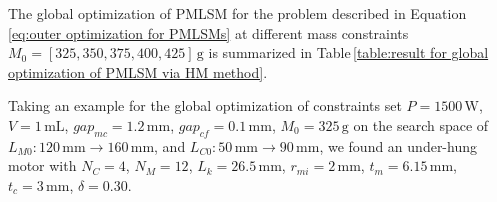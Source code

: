             
        The global optimization of \acs{PMLSM} for the problem described in Equation\,\ref{eq:outer optimization for PMLSMs} at different mass constraints $M_0=[325,350,375,400,425]\,\mathrm{g}$ is summarized in Table\,\ref{table:result for global optimization of PMLSM via HM method}.
            
            
        Taking an example for the global optimization of constraints set $P=1500\,\mathrm{W}$, $V=1\,\mathrm{mL}$, $gap_{mc}=1.2\,\mathrm{mm}$, $gap_{cf}=0.1\,\mathrm{mm}$, $M_0=325\,\mathrm{g}$ on the search space of $L_{M0}:120\,\mathrm{mm}\rightarrow 160\,\mathrm{mm}$, and $L_{C0}:50\,\mathrm{mm}\rightarrow 90\,\mathrm{mm}$, we found an under-hung motor with $N_C=4$, $N_M=12$, $L_k=26.5\,\mathrm{mm}$, $r_{mi}=2\,\mathrm{mm}$, $t_m=6.15\,\mathrm{mm}$, $t_c=3\,\mathrm{mm}$, $\delta=0.30$. 
            
